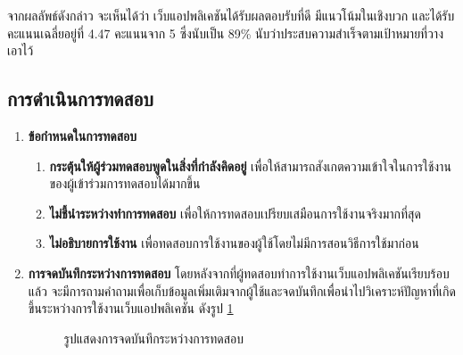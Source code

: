 \begin{enumerate}
        จากผลลัพธ์ดังกล่าว จะเห็นได้ว่า เว็บแอปพลิเคชันได้รับผลตอบรับที่ดี มีแนวโน้มในเชิงบวก และได้รับคะแนนเฉลี่ยอยู่ที่ 4.47 คะแนนจาก 5 ซึ่งนับเป็น 89\%
        นับว่าประสบความสำเร็จตามเป้าหมายที่วางเอาไว้
        
\end{enumerate}
\subsection{การดำเนินการทดสอบ}
\begin{enumerate}
    \item \textbf{ข้อกำหนดในการทดสอบ}
          \begin{enumerate}
              \item \textbf{กระตุ้นให้ผู้ร่วมทดสอบพูดในสิ่งที่กำลังคิดอยู่} เพื่อให้สามารถสังเกตความเข้าใจในการใช้งานของผู้เข้าร่วมการทดสอบได้มากขึ้น
              \item \textbf{ไม่ชี้นำระหว่างทำการทดสอบ} เพื่อให้การทดสอบเปรียบเสมือนการใช้งานจริงมากที่สุด
              \item \textbf{ไม่อธิบายการใช้งาน} เพื่อทดสอบการใช้งานของผู้ใช้โดยไม่มีการสอนวิธีการใช้มาก่อน
          \end{enumerate}
    \item \textbf{การจดบันทึกระหว่างการทดสอบ} โดยหลังจากที่ผู้ทดสอบทำการใช้งานเว็บแอปพลิเคชันเรียบร้อบแล้ว จะมีการถามคำถามเพื่อเก็บข้อมูลเพิ่มเติมจากผู้ใช้และจดบันทึกเพื่อนำไปวิเคราะห์ปัญหาที่เกิดขึ้นระหว่างการใช้งานเว็บแอปพลิเคชัน ดังรูป \ref{fig:NoteTaking}
          \begin{figure}[H]\centering
              \caption{รูปแสดงการจดบันทึกระหว่างการทดสอบ}\label{fig:NoteTaking}
          \end{figure}
\end{enumerate}
